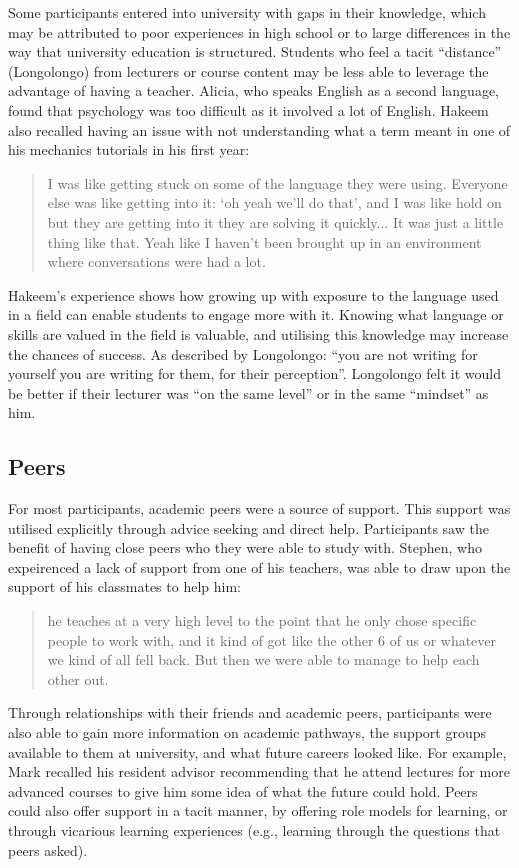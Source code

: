 Some participants entered into university with gaps in their knowledge, which may be attributed to poor experiences in high school or to large differences in the way that university education is structured. Students who feel a tacit ``distance'' (Longolongo) from lecturers or course content may be less able to leverage the advantage of having a teacher. Alicia, who speaks English as a second language, found that psychology was too difficult as it involved a lot of English. Hakeem also recalled having an issue with not understanding what a term meant in one of his mechanics tutorials in his first year: \blockquote{I was like getting stuck on some of the language they were using. Everyone else was like getting into it: `oh yeah we’ll do that', and I was like hold on but they are getting into it they are solving it quickly... It was just a little thing like that. Yeah like I haven’t been brought up in an environment where conversations were had a lot.} Hakeem's experience shows how growing up with exposure to the language used in a field can enable students to engage more with it. Knowing what language or skills are valued in the field is valuable, and utilising this knowledge may increase the chances of success. As described by Longolongo: ``you are not writing for yourself you are writing for them, for their perception''. Longolongo felt it would be better if their lecturer was ``on the same level'' or in the same ``mindset'' as him. 



\subsection{Peers}
For most participants, academic peers were a source of support. This support was utilised explicitly through advice seeking and direct help. Participants saw the benefit of having close peers who they were able to study with. Stephen, who expeirenced a lack of support from one of his teachers, was able to draw upon the support of his classmates to help him: \blockquote{he teaches at a very high level to the point that he only chose specific people to work with, and it kind of got like the other 6 of us or whatever we kind of all fell back. But then we were able to manage to help each other out.}  Through relationships with their friends and academic peers, participants were also able to gain more information on academic pathways, the support groups available to them at university, and what future careers looked like. For example, Mark recalled his resident advisor recommending that he attend lectures for more advanced courses to give him some idea of what the future could hold. Peers could also offer support in a tacit manner, by offering role models for learning, or through vicarious learning experiences (e.g., learning through the questions that peers asked). 

